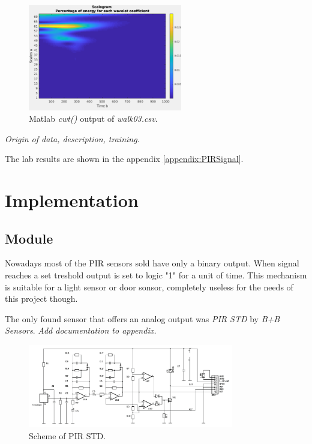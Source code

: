 \begin{figure}[h!]
\begin{center}
\includegraphics[width=0.6\textwidth]{obrazky-figures/walk03.png}
\caption{Matlab {\it cwt()} output of {\it walk03.csv}.\label{fig:walk03}}
\end{center}
\end{figure}


{\it Origin of data, description, training.}

The lab results are shown in the appendix \ref{appendix:PIRSignal}.




\chapter{Implementation}

\section{Module}

Nowadays most of the PIR sensors sold have only a binary output.
When signal reaches a set treshold output is set to logic "1" for a unit of time.
This mechanism is suitable for a light sensor or door sonsor, completely useless
for the needs of this project though.

The only found sensor that offers an analog output was {\it PIR STD} by
{\it B+B Sensors}. {\it Add documentation to appendix.}

\begin{figure}[h!]
\begin{center}
\includegraphics[width=0.8\textwidth]{obrazky-figures/pirstd.png}
\caption{Scheme of PIR STD.\cite{PIROperationalManual}\label{fig:pirstd}}
\end{center}
\end{figure}

